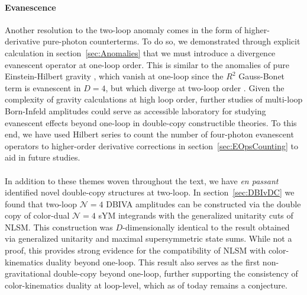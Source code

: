 \documentclass[12pt,letter]{article}
\def\sect#1{section~\ref{#1}}
\begin{document}
\paragraph{\textbf{Evanescence}}Another resolution to the two-loop anomaly comes in the form of higher-derivative pure-photon counterterms. To do so, we demonstrated through explicit calculation in \sect{sec:Anomalies} that we must introduce a divergence evanescent operator at one-loop order. This is similar to the anomalies of pure Einstein-Hilbert gravity \cite{Bern:2015xsa,Bern:2017puu}, which vanish at one-loop since the $R^2$ Gauss-Bonet term is evanescent in $D=4$, but which diverge at two-loop order \cite{Goroff:1985sz,Goroff:1985th,vandeVen:1991gw}. Given the complexity of gravity calculations at high loop order, further studies of multi-loop Born-Infeld amplitudes could serve as accessible laboratory for studying evanescent effects beyond one-loop in double-copy constructible theories. To this end, we have used Hilbert series to count the number of four-photon evanescent operators to higher-order derivative corrections in \sect{sec:EOpsCounting} to aid in future studies. 

\paragraph{} In addition to these themes woven throughout the text, we have \textit{en passant} identified novel double-copy structures at two-loop. In \sect{sec:DBIvDC} we found that two-loop $\mathcal{N}=4$ DBIVA amplitudes can be constructed via the double copy of color-dual $\mathcal{N}=4$ sYM integrands with the generalized unitarity cuts of NLSM. This construction was $D$-dimensionally identical to the result obtained via generalized unitarity and maximal supersymmetric state sums. While not a proof, this provides strong evidence for the compatibility of NLSM with color-kinematics duality beyond one-loop. This result also serves as the first non-gravitational double-copy beyond one-loop, further supporting the consistency of color-kinematics duality at loop-level, which as of today remains a conjecture. 
\end{document}
